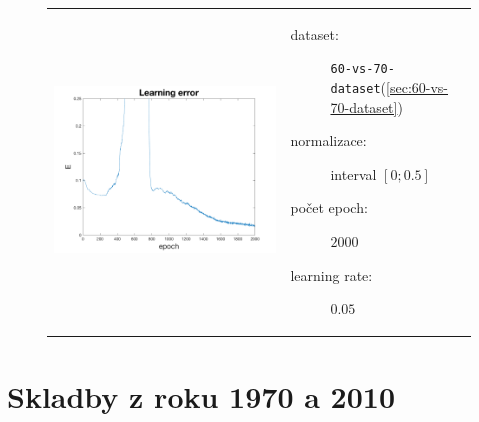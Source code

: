 \documentclass[thesis=M,czech]{FITthesis}[2012/06/26]
\begin{document}
\begin{figure}[htbp]
\begin{tabular}{p{}p{}}
    \begin{minipage}{.5\textwidth}
    \centering
    \includegraphics[scale=0.3]{err_60-vs-70.png}
    \label{fig:fig1}
    \end{minipage}
    &
    \begin{minipage}{.5\textwidth}
		\begin{description}
            \item[dataset:] \texttt{60-vs-70-dataset}(\ref{sec:60-vs-70-dataset})
            \item[normalizace:] interval $[0;0.5]$
            \item[počet epoch:] $2000$
            \item[learning rate:] $0.05$
        \end{description}
\end{minipage}
\end{tabular}
\end{figure}


\section{Skladby z roku 1970 a 2010}\label{exp:70-vs-10}
\end{document}

